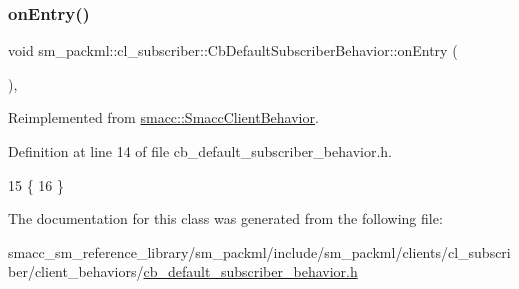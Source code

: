 \subsubsection{\texorpdfstring{on\+Entry()}{onEntry()}}
{\footnotesize\ttfamily void sm\+\_\+packml\+::cl\+\_\+subscriber\+::\+Cb\+Default\+Subscriber\+Behavior\+::on\+Entry (\begin{DoxyParamCaption}{ }\end{DoxyParamCaption})\hspace{0.3cm}{\ttfamily [inline]}, {\ttfamily [virtual]}}



Reimplemented from \hyperlink{classsmacc_1_1SmaccClientBehavior_ad5d3e1f1697c3cfe66c94cadba948493}{smacc\+::\+Smacc\+Client\+Behavior}.



Definition at line 14 of file cb\+\_\+default\+\_\+subscriber\+\_\+behavior.\+h.


\begin{DoxyCode}
15     \{
16     \}
\end{DoxyCode}


The documentation for this class was generated from the following file\+:\begin{DoxyCompactItemize}
\item 
smacc\+\_\+sm\+\_\+reference\+\_\+library/sm\+\_\+packml/include/sm\+\_\+packml/clients/cl\+\_\+subscriber/client\+\_\+behaviors/\hyperlink{sm__packml_2include_2sm__packml_2clients_2cl__subscriber_2client__behaviors_2cb__default__subscriber__behavior_8h}{cb\+\_\+default\+\_\+subscriber\+\_\+behavior.\+h}\end{DoxyCompactItemize}

